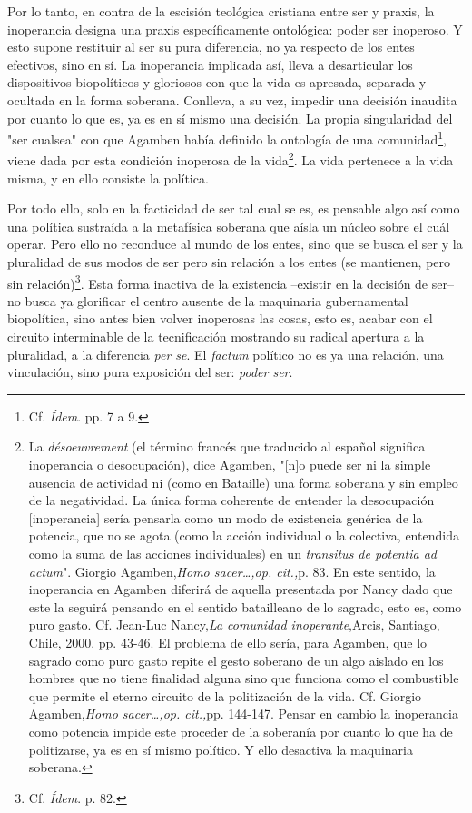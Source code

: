 \documentclass{book}
\begin{document}
Por lo tanto, en contra de la escisión teológica cristiana entre ser y
praxis, la inoperancia designa una praxis específicamente ontológica:
poder ser inoperoso. Y esto supone restituir al ser su pura diferencia,
no ya respecto de los entes efectivos, sino en sí. La inoperancia
implicada así, lleva a desarticular los dispositivos biopolíticos y
gloriosos con que la vida es apresada, separada y ocultada en la forma
soberana. Conlleva, a su vez, impedir una decisión inaudita por cuanto
lo que es, ya es en sí mismo una decisión. La propia singularidad del
"ser cualsea" con que Agamben había definido la ontología de una
comunidad\footnote{Cf. \emph{Ídem}. pp. 7 a 9.}, viene dada por esta
condición inoperosa de la vida\footnote{La \emph{désoeuvrement} (el
  término francés que traducido al español significa inoperancia o
  desocupación), dice Agamben, "{[}n{]}o puede ser ni la simple ausencia
  de actividad ni (como en Bataille) una forma soberana y sin empleo de
  la negatividad. La única forma coherente de entender la desocupación
  {[}inoperancia{]} sería pensarla como un modo de existencia genérica
  de la potencia, que no se agota (como la acción individual o la
  colectiva, entendida como la suma de las acciones individuales) en un
  \emph{transitus de potentia ad actum}". Giorgio Agamben,\emph{Homo
  sacer\ldots,op. cit.,}p. 83. En este sentido, la inoperancia en
  Agamben diferirá de aquella presentada por Nancy dado que este la
  seguirá pensando en el sentido batailleano de lo sagrado, esto es,
  como puro gasto. Cf. Jean-Luc Nancy,\emph{La comunidad
  inoperante},Arcis, Santiago, Chile, 2000. pp. 43-46. El problema de
  ello sería, para Agamben, que lo sagrado como puro gasto repite el
  gesto soberano de un algo aislado en los hombres que no tiene
  finalidad alguna sino que funciona como el combustible que permite el
  eterno circuito de la politización de la vida. Cf. Giorgio
  Agamben,\emph{Homo sacer\ldots,op. cit.,}pp. 144-147. Pensar en cambio
  la inoperancia como potencia impide este proceder de la soberanía por
  cuanto lo que ha de politizarse, ya es en sí mismo político. Y ello
  desactiva la maquinaria soberana.}. La vida pertenece a la vida misma,
y en ello consiste la política.

Por todo ello, solo en la facticidad de ser tal cual se es, es pensable
algo así como una política sustraída a la metafísica soberana que aísla
un núcleo sobre el cuál operar. Pero ello no reconduce al mundo de los
entes, sino que se busca el ser y la pluralidad de sus modos de ser pero
sin relación a los entes (se mantienen, pero sin relación)\footnote{Cf.
  \emph{Ídem}. p. 82.}. Esta forma inactiva de la existencia --existir
en la decisión de ser-- no busca ya glorificar el centro ausente de la
maquinaria gubernamental biopolítica, sino antes bien volver inoperosas
las cosas, esto es, acabar con el circuito interminable de la
tecnificación mostrando su radical apertura a la pluralidad, a la
diferencia \emph{per se}. El \emph{factum} político no es ya una
relación, una vinculación, sino pura exposición del ser: \emph{poder
ser}.
\end{document}
